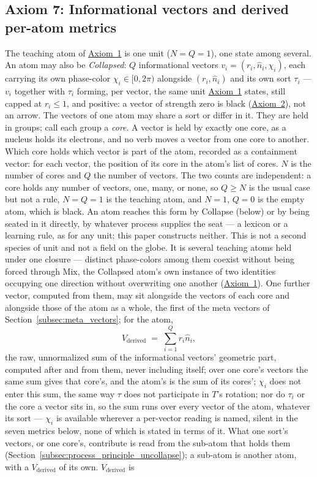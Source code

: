 \documentclass[12pt, a4paper]{article}
\begin{document}
\subsection{Axiom 7: Informational vectors and derived per-atom metrics}
\label{subsec:axiom_v1_metrics}
The teaching atom of \hyperref[subsec:axiom1]{Axiom~1} is one unit
($N=Q=1$), one state among several. An atom may also be \emph{Collapsed}: $Q$ informational
vectors $v_i=(r_i,\hat n_i,\chi_i)$, each carrying its own phase-color $\chi_i\in[0,2\pi)$ alongside $(r_i,\hat n_i)$ and its own sort $\tau_i$ --- $v_i$ together with $\tau_i$ forming, per vector, the same unit \hyperref[subsec:axiom1]{Axiom~1} states, still capped at $r_i\le 1$, and positive: a vector of strength zero is black
(\hyperref[subsec:axiom_null]{Axiom~2}), not an arrow. The vectors of one atom may share a sort or differ in it. They are held in groups; call each group a \emph{core}. A vector is held by exactly one core, as a nucleus holds its electrons, and no verb moves a vector from one core to another. Which core holds which vector is part of the atom, recorded as a containment vector: for each vector, the position of its core in the atom's list of cores. $N$ is the number of cores and $Q$ the number of vectors. The
two counts are independent: a core holds any number of vectors, one,
many, or none, so $Q\ge N$ is the usual case but not a rule, $N=Q=1$
is the teaching atom, and $N=1$, $Q=0$ is the empty atom, which is
black. An atom reaches this form by Collapse (below) or by being
seated in it directly, by whatever process supplies the seat --- a
lexicon or a learning rule, as for any unit; this paper constructs
neither. This is not a second species of unit and not a field on the
globe. It is several teaching atoms held under one closure ---
distinct phase-colors among them coexist without being forced
through Mix, the Collapsed atom's own instance of two identities occupying
one direction without overwriting one another
(\hyperref[subsec:axiom1]{Axiom~1}). One further vector, computed from
them, may sit alongside the vectors of each core and alongside those of
the atom as a whole, the first of the meta vectors of
Section~\ref{subsec:meta_vectors}; for the atom,
\[
V_{\text{derived}} \;=\; \sum_{i=1}^{Q} r_i\hat n_i,
\]
the raw, unnormalized sum of the informational vectors' geometric
part, computed after and from them, never including itself; over one core's
vectors the same sum gives that core's, and the atom's is the sum of its
cores'; $\chi_i$ does not enter this sum, the same way $\tau$ does not participate in $T$'s rotation; nor do $\tau_i$ or the core a vector sits in, so the sum runs over every vector of the atom, whatever its sort --- $\chi_i$ is available wherever a per-vector reading is named, silent in the seven metrics below, none of which is stated in terms of it. What one sort's vectors, or one core's, contribute is read from the sub-atom that holds them (Section~\ref{subsec:process_principle_uncollapse}); a sub-atom is another atom, with a $V_{\text{derived}}$ of its own. $V_{\text{derived}}$ is
\end{document}
